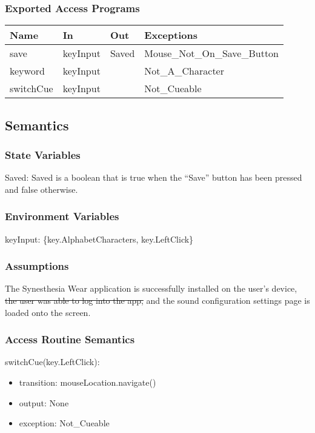 \documentclass[12pt, titlepage]{article}
\begin{document}
\subsubsection{Exported Access Programs}

\begin{center}
\begin{tabular}{p{4cm} p{4cm} p{4cm} p{4cm}}
\hline
\textbf{Name} & \textbf{In} & \textbf{Out} & \textbf{Exceptions} \\
\hline
save & keyInput & Saved & Mouse\_Not\_On\_Save\_Button\\
\hline
keyword & keyInput &  & Not\_A\_Character \\
\hline
switchCue & keyInput &  & Not\_Cueable \\
\hline
\end{tabular}
\end{center}

\subsection{Semantics}

\subsubsection{State Variables}

Saved: Saved is a boolean that is true when the ``Save'' button has been pressed and false otherwise.

\subsubsection{Environment Variables}

keyInput: \{key.AlphabetCharacters, key.LeftClick\}

\subsubsection{Assumptions}

The Synesthesia Wear application is successfully installed on the user's device, \sout{the user was able to log into the app,} 
and the sound configuration settings page is loaded onto the screen.

\subsubsection{Access Routine Semantics}

\noindent switchCue(key.LeftClick):
\begin{itemize}
\item transition: mouseLocation.navigate() 
\item output: None
\item exception: Not\_Cueable 
\end{itemize}
\end{document}
